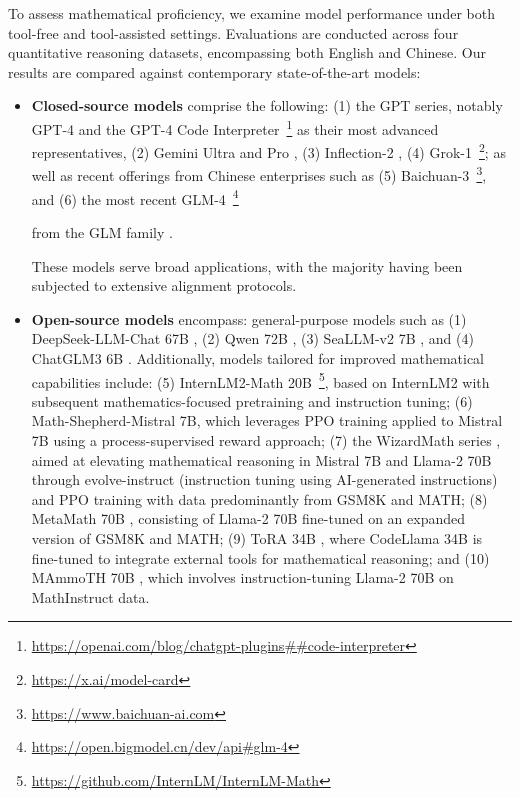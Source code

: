 \begin{itemize}[topsep=0pt]
To assess mathematical proficiency, we examine model performance under both tool-free and tool-assisted settings. Evaluations are conducted across four quantitative reasoning datasets, encompassing both English and Chinese. Our results are compared against contemporary state-of-the-art models:

\begin{itemize}[topsep=0pt]
    \item \textbf{Closed-source models} comprise the following: (1) the GPT series, notably GPT-4 \citep{gpt4} and the GPT-4 Code Interpreter~\footnote{\url{https://openai.com/blog/chatgpt-plugins\#\#code-interpreter}} as their most advanced representatives, (2) Gemini Ultra and Pro \citep{gemini}, (3) Inflection-2 \citep{inflection-2}, (4) Grok-1~\footnote{\url{https://x.ai/model-card}}; as well as recent offerings from Chinese enterprises such as (5) Baichuan-3~\footnote{\url{https://www.baichuan-ai.com}}, and (6) the most recent GLM-4~\footnote{\url{https://open.bigmodel.cn/dev/api\#glm-4}}

    from the GLM family \citep{glm}.

These models serve broad applications, with the majority having been subjected to extensive alignment protocols.
    \item \textbf{Open-source models} encompass: general-purpose models such as (1) DeepSeek-LLM-Chat 67B \citep{deepseek-llm}, (2) Qwen 72B \citep{qwen}, (3) SeaLLM-v2 7B \citep{seallm}, and (4) ChatGLM3 6B \citep{chatglm3}. Additionally, models tailored for improved mathematical capabilities include: (5) InternLM2-Math 20B~\footnote{\url{https://github.com/InternLM/InternLM-Math}}, based on InternLM2 with subsequent mathematics-focused pretraining and instruction tuning; (6) Math-Shepherd-Mistral 7B, which leverages PPO training \citep{schulman2017proximal} applied to Mistral 7B \citep{mistral} using a process-supervised reward approach; (7) the WizardMath series \citep{wizardmath}, aimed at elevating mathematical reasoning in Mistral 7B and Llama-2 70B \citep{llama2} through evolve-instruct (instruction tuning using AI-generated instructions) and PPO training with data predominantly from GSM8K and MATH; (8) MetaMath 70B \citep{metamath}, consisting of Llama-2 70B fine-tuned on an expanded version of GSM8K and MATH; (9) ToRA 34B \cite{tora}, where CodeLlama 34B is fine-tuned to integrate external tools for mathematical reasoning; and (10) MAmmoTH 70B \citep{MathInstruct}, which involves instruction-tuning Llama-2 70B on MathInstruct data.


\end{itemize}
\end{itemize}
